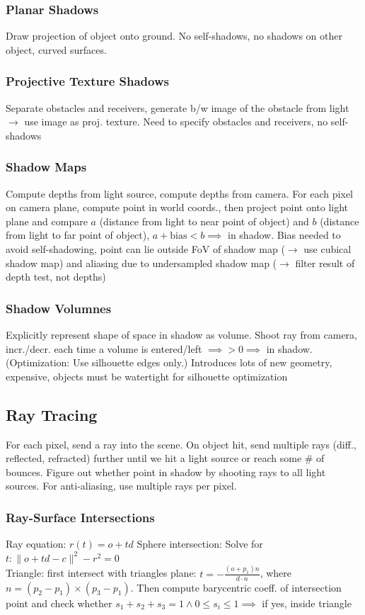 \documentclass[a4paper,10pt]{article}
\begin{document}
\subsubsection{Planar Shadows} Draw projection of object onto ground. No self-shadows, no shadows on other object, curved surfaces.

\subsubsection{Projective Texture Shadows} Separate obstacles and receivers, generate b/w image of the obstacle from light \( \to  \) use image as proj. texture. Need to specify obstacles and receivers, no self-shadows
\subsubsection{Shadow Maps} Compute depths from light source, compute depths from camera. For each pixel on camera plane, compute point in world coords., then project point onto light plane and compare \( a \) (distance from light to near point of object) and \( b \) (distance from light to far point of object), \( a + \text{bias} < b \implies \) in shadow. Bias needed to avoid self-shadowing, point can lie outside FoV of shadow map (\( \to \) use cubical shadow map) and aliasing due to undersampled shadow map (\( \to  \) filter result of depth test, not depths)

\subsubsection{Shadow Volumnes} Explicitly represent shape of space in shadow as volume. Shoot ray from camera, incr./decr. each time a volume is entered/left \( \implies > 0 \implies \) in shadow. (Optimization: Use silhouette edges only.) Introduces lots of new geometry, expensive, objects must be watertight for silhouette optimization

\subsection{Ray Tracing}
For each pixel, send a ray into the scene. On object hit, send multiple rays (diff., reflected, refracted) further until we hit a light source or reach some \# of bounces. Figure out whether point in shadow by shooting rays to all light sources. For anti-aliasing, use multiple rays per pixel.

\subsubsection{Ray-Surface Intersections} Ray equation: \( r(t) = o + td \)
Sphere intersection: Solve for \( t: \lVert o + td - c \rVert ^2 - r^2 = 0 \) \\
Triangle: first intersect with triangles plane: \( t = -\frac{(o+p_{1})n}{d\cdot n} \), where \( n = (p_{2}-p_{1})\times(p_{3}-p_{1}) \).
Then compute barycentric coeff. of intersection point and check whether \( s_{1}+s_{2}+s_{3} = 1 \land 0 \le s_i \le 1 \implies \) if yes, inside triangle
\end{document}

